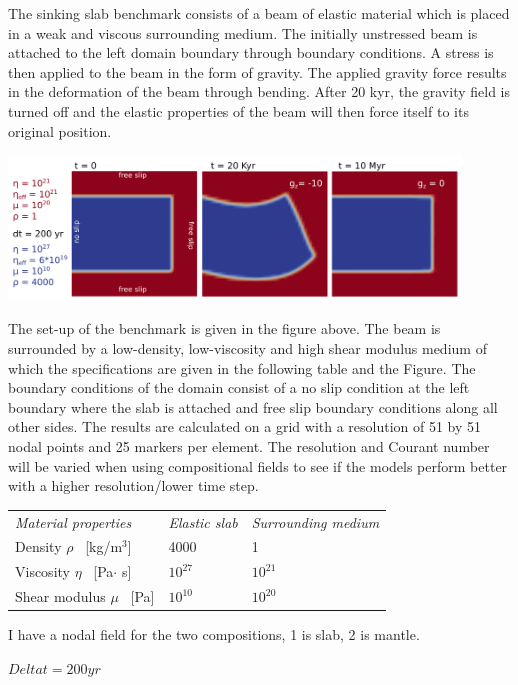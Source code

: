 The sinking slab benchmark consists of a beam of elastic material which is placed 
in a weak and viscous surrounding medium. The initially unstressed beam is attached 
to the left domain boundary through boundary conditions. A stress is then applied to 
the beam in the form of gravity. The applied gravity force results in the deformation 
of the beam through bending. After 20 kyr, the gravity field is turned off and the 
elastic properties of the beam will then force itself to its original position.  

\begin{center}
\includegraphics[width=0.9\textwidth]{python_codes/fieldstone_64/images/poster_benchmark.png}\\
\end{center}


The set-up of the benchmark is given in the figure above. 
The beam is surrounded by a low-density, low-viscosity and high shear modulus medium 
of which the specifications are given in  the following table and the Figure. 
The boundary conditions of the domain consist of a no slip condition at 
the left boundary where the slab is attached and free slip boundary conditions along all other sides. 
The results are calculated on a grid with a resolution of 51 by 51 nodal points 
and 25 markers per element. 
The resolution and Courant number will be varied when using compositional fields to see 
if the models perform better with a higher resolution/lower time step. 

\begin{center}
\begin{tabular}{lll}
\textit{Material properties}& \textit{Elastic slab}  & \textit{Surrounding medium} \\ 
Density         $\rho$ \     [kg/m$^{3}$]      & 4000                    & 1     \\
Viscosity       $\eta$ \    [Pa$\cdot$ s]      & $10^{27}$                   &   $10^{21}$     \\
Shear modulus   $\mu $ \    [Pa]            & $10^{10}$                    & $10^{20}$       \\ 
\end{tabular} 
\end{center}

I have a nodal field for the two compositions, 1 is slab, 2 is mantle. 

$Delta t = 200yr$




